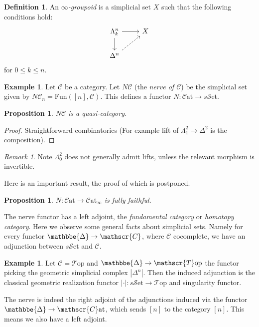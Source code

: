 \documentclass[10pt]{amsart}
\newcommand{\C}{\mathscr{C}}
\newcommand{\cat}{\mathscr{C}\mathrm{at}}
\newcommand{\sset}{s\mathscr{S}\mathrm{et}}
\newcommand{\Fun}{\mathrm{Fun}}
\newcommand{\Top}{\mathscr{T}\mathrm{op}}
\def\DDelta{{\mathbbe{\Delta}}}
\newcommand{\DD}{\DDelta}
\newtheorem{proposition}[equation]{Proposition}
\theoremstyle{definition}
\newtheorem{definition}[equation]{Definition}
\newtheorem{example}[equation]{Example}
\theoremstyle{remark}
\newtheorem{remark}[equation]{Remark}
\begin{document}
\begin{definition}
  An \emph{$\infty$-groupoid} is a simplicial set $X$ such that the following conditions hold:
  \[
    \begin{tikzcd}
    \Lambda^n_k \arrow[r] \arrow[d] & X \\
    \Delta^n \arrow[ur, dashed] 
    \end{tikzcd}
  \]
  for $0 \leq k \leq n$.
\end{definition}

\begin{example}
  Let $\C$ be a category. Let $N\C$ (the \emph{nerve of $\C$}) be the simplicial set given by $N\C_n = \Fun([n],\C)$. This defines a functor $N\colon\cat \to \sset$.
\end{example}

\begin{proposition}
  $N\C$ is a quasi-category.
\end{proposition}

\begin{proof}
Straightforward combinatorics (For example lift of $\Lambda^2_1 \to \Delta^2$ is the composition).
\end{proof}

\begin{remark}
 Note $\Lambda^2_0$ does not generally admit lifts, unless the relevant morphism is invertible.
\end{remark}

Here is an important result, the proof of which is postponed.

\begin{proposition}
  $N\colon \cat \to \cat_\infty$ is fully faithful.
\end{proposition}

The nerve functor has a left adjoint, the \emph{fundamental category} or \emph{homotopy category}. Here we observe some general facts about simplicial sets. Namely for every  functor $\DD \to \C$, where $\C$ cocomplete, we have an adjunction between $\sset$ and $\C$.



\begin{example}
  Let $\C= \Top$ and $\DD \to \Top$ the functor picking the geometric simplicial complex $|\Delta^n|$. Then the induced adjunction is the classical geometric realization functor $| \cdot | \colon \sset \to \Top$ and singularity functor.
\end{example}

The nerve is indeed the right adjoint of the adjunctions induced via the functor $\DD \to \cat$, which sends $[n]$ to the category $[n]$. This means we also have a left adjoint. 
\end{document}
